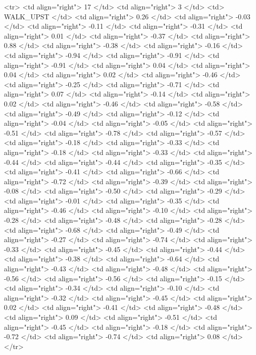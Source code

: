   <tr> <td align="right"> 17 </td> <td align="right">   3 </td> <td> WALK_UPST </td> <td align="right"> 0.26 </td> <td align="right"> -0.03 </td> <td align="right"> -0.11 </td> <td align="right"> -0.31 </td> <td align="right"> 0.01 </td> <td align="right"> -0.37 </td> <td align="right"> 0.88 </td> <td align="right"> -0.38 </td> <td align="right"> -0.16 </td> <td align="right"> -0.94 </td> <td align="right"> -0.91 </td> <td align="right"> -0.91 </td> <td align="right"> 0.04 </td> <td align="right"> 0.04 </td> <td align="right"> 0.02 </td> <td align="right"> -0.46 </td> <td align="right"> -0.25 </td> <td align="right"> -0.71 </td> <td align="right"> 0.07 </td> <td align="right"> -0.14 </td> <td align="right"> 0.02 </td> <td align="right"> -0.46 </td> <td align="right"> -0.58 </td> <td align="right"> -0.49 </td> <td align="right"> -0.12 </td> <td align="right"> -0.04 </td> <td align="right"> -0.05 </td> <td align="right"> -0.51 </td> <td align="right"> -0.78 </td> <td align="right"> -0.57 </td> <td align="right"> -0.18 </td> <td align="right"> -0.33 </td> <td align="right"> -0.18 </td> <td align="right"> -0.33 </td> <td align="right"> -0.44 </td> <td align="right"> -0.44 </td> <td align="right"> -0.35 </td> <td align="right"> -0.41 </td> <td align="right"> -0.66 </td> <td align="right"> -0.72 </td> <td align="right"> -0.39 </td> <td align="right"> -0.08 </td> <td align="right"> -0.50 </td> <td align="right"> -0.29 </td> <td align="right"> -0.01 </td> <td align="right"> -0.35 </td> <td align="right"> -0.46 </td> <td align="right"> -0.10 </td> <td align="right"> -0.28 </td> <td align="right"> -0.48 </td> <td align="right"> -0.28 </td> <td align="right"> -0.68 </td> <td align="right"> -0.49 </td> <td align="right"> -0.27 </td> <td align="right"> -0.74 </td> <td align="right"> -0.33 </td> <td align="right"> -0.45 </td> <td align="right"> -0.44 </td> <td align="right"> -0.38 </td> <td align="right"> -0.64 </td> <td align="right"> -0.43 </td> <td align="right"> -0.48 </td> <td align="right"> -0.56 </td> <td align="right"> -0.56 </td> <td align="right"> -0.15 </td> <td align="right"> -0.34 </td> <td align="right"> -0.10 </td> <td align="right"> -0.32 </td> <td align="right"> -0.45 </td> <td align="right"> 0.02 </td> <td align="right"> -0.41 </td> <td align="right"> -0.48 </td> <td align="right"> 0.09 </td> <td align="right"> -0.51 </td> <td align="right"> -0.45 </td> <td align="right"> -0.18 </td> <td align="right"> -0.72 </td> <td align="right"> -0.74 </td> <td align="right"> 0.08 </td> </tr>
